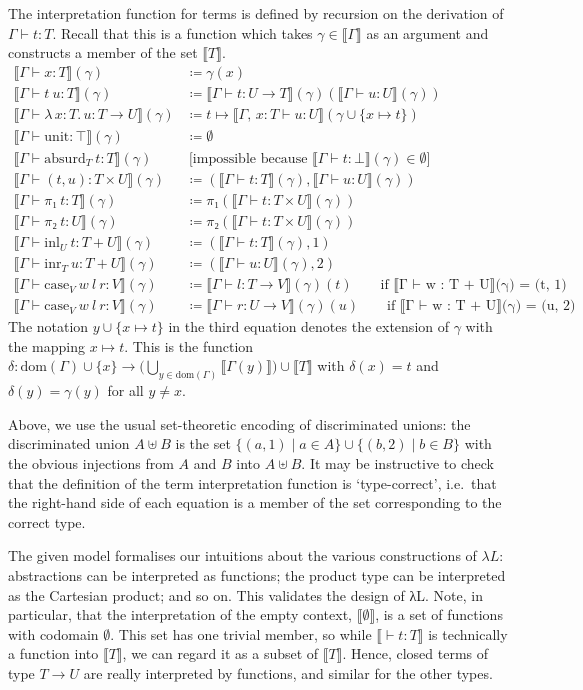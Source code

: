 \documentclass{scrartcl}
\theoremstyle{definition}
\newcommand{\dom}{\mathrm{dom}}
\newcommand{\Lam}[2]{λ\,#1.\, #2}
\newcommand{\unit}{\mathrm{unit}}
\newcommand{\absurd}{\mathrm{absurd}}
\newcommand{\inl}{\ensuremath{\mathrm{inl}}}
\newcommand{\inr}{\ensuremath{\mathrm{inr}}}
\newcommand{\case}{\mathrm{case}}
\begin{document}
\begin{definition}
  The interpretation function for terms is defined by recursion on the derivation of $Γ ⊢ t : T$.
  Recall that this is a function which takes $γ ∈ ⟦Γ⟧$ as an argument and constructs a member of the set $⟦T⟧$.
  \begin{align*}
    ⟦Γ ⊢ x : T⟧(γ) &≔ γ(x) \\
    ⟦Γ ⊢ t~u : T⟧(γ) &≔ ⟦Γ ⊢ t : U → T⟧(γ)(⟦Γ ⊢ u : U⟧(γ)) \\
    ⟦Γ ⊢ \Lam{x : T}{u} : T → U⟧(γ) &≔ t ↦ ⟦Γ,\, x : T ⊢ u : U⟧(γ ∪ \{x ↦ t\}) \\
    ⟦Γ ⊢ \unit : ⊤⟧(γ) &≔ ∅ \\
    ⟦Γ ⊢ \absurd_{T}~t : T⟧(γ) &~\text{[impossible because $⟦Γ ⊢ t : ⊥⟧(γ) ∈ ∅$]} \\
    ⟦Γ ⊢ (t, u) : T × U⟧(γ) &≔ (⟦Γ ⊢ t : T⟧(γ), ⟦Γ ⊢ u : U⟧(γ)) \\
    ⟦Γ ⊢ π₁~t : T⟧(γ) &≔ π₁(⟦Γ ⊢ t : T × U⟧(γ)) \\
    ⟦Γ ⊢ π₂~t : U⟧(γ) &≔ π₂(⟦Γ ⊢ t : T × U⟧(γ)) \\
    ⟦Γ ⊢ \inl_{U}~t : T + U⟧(γ) &≔ (⟦Γ ⊢ t : T⟧(γ), 1) \\
    ⟦Γ ⊢ \inr_{T}~u : T + U⟧(γ) &≔ (⟦Γ ⊢ u : U⟧(γ), 2) \\
    ⟦Γ ⊢ \case_{V}~w~l~r : V⟧(γ) &≔ ⟦Γ ⊢ l : T → V⟧(γ)(t) \qquad \text{if ⟦Γ ⊢ w : T + U⟧(γ) = (t, 1)} \\
    ⟦Γ ⊢ \case_{V}~w~l~r : V⟧(γ) &≔ ⟦Γ ⊢ r : U → V⟧(γ)(u) \qquad \text{if ⟦Γ ⊢ w : T + U⟧(γ) = (u, 2)}
  \end{align*}
  The notation $y ∪ \{x ↦ t\}$ in the third equation denotes the extension of $γ$ with the mapping $x ↦ t$.
  This is the function $δ : \dom(Γ) ∪ \{x\} → \bigl(⋃_{y ∈ \dom(Γ)} ⟦Γ(y)⟧\bigr) ∪ ⟦T⟧$ with $δ(x) = t$ and $δ(y) = γ(y)$ for all $y ≠ x$.
\end{definition}

Above, we use the usual set-theoretic encoding of discriminated unions: the discriminated union $A ⊎ B$ is the set $\{ (a, 1) \mid a ∈ A \} ∪ \{ (b, 2) \mid b ∈ B\}$ with the obvious injections from $A$ and $B$ into $A ⊎ B$.
It may be instructive to check that the definition of the term interpretation function is \enquote*{type-correct}, i.e.\ that the right-hand side of each equation is a member of the set corresponding to the correct type.

The given model formalises our intuitions about the various constructions of $λL$: abstractions can be interpreted as functions; the product type can be interpreted as the Cartesian product; and so on.
This validates the design of λL.
Note, in particular, that the interpretation of the empty context, $⟦∅⟧$, is a set of functions with codomain $∅$.
This set has one trivial member, so while $⟦⊢ t : T⟧$ is technically a function into $⟦T⟧$, we can regard it as a subset of $⟦T⟧$.
Hence, closed terms of type $T → U$ are really interpreted by functions, and similar for the other types.
\end{document}
